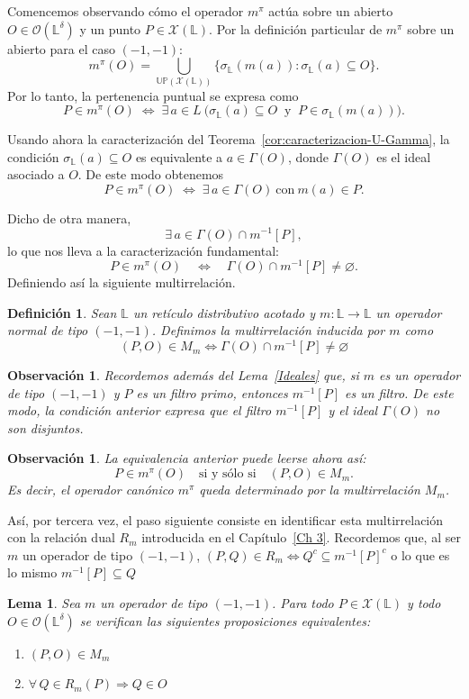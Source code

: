 \documentclass[12pt]{book}
\newtheorem{lemma}[theorem]{Lema}
\newtheorem{definition}[theorem]{Definición}
\newtheorem{remark}[theorem]{Observación}
\newcommand{\Up}{\mathbb{UP}}
\begin{document}
Comencemos observando cómo el operador $m^\pi$ actúa sobre un abierto $O\in\mathcal{O}(\mathbb{L}^\delta)$ y un punto $P\in\mathcal{X}(\mathbb L)$.
Por la definición particular de $m^\pi$ sobre un abierto para el caso $(-1,-1)$:
\[
m^\pi(O)=\bigcup_{\Up(\mathcal{X}(\mathbb L))}\{\sigma_{\mathbb L}(m(a)):\sigma_{\mathbb L}(a)\subseteq O\}.
\]
Por lo tanto, la pertenencia puntual se expresa como
\[
P\in m^\pi(O)
\;\Longleftrightarrow\;
\exists\,a\in L\ 
\bigl(\sigma_{\mathbb L}(a)\subseteq O
\ \text{ y }\ 
P\in\sigma_{\mathbb L}(m(a))\bigr).
\]

Usando ahora la caracterización del Teorema~\ref{cor:caracterizacion-U-Gamma},
la condición $\sigma_{\mathbb L}(a)\subseteq O$ es equivalente a
$a\in\Gamma(O)$, donde $\Gamma(O)$ es el ideal asociado a $O$.
De este modo obtenemos
\[
P\in m^\pi(O)
\;\Longleftrightarrow\;
\exists\,a\in\Gamma(O)\ \text{con}\ m(a)\in P.
\]

Dicho de otra manera,
\[
\exists\,a\in\Gamma(O)\cap m^{-1}[P],
\]
lo que nos lleva a la caracterización fundamental:
\[
P\in m^\pi(O)
\quad\Longleftrightarrow\quad
\Gamma(O)\cap m^{-1}[P]\neq\varnothing.
\]
Definiendo así la siguiente multirrelación.

\begin{definition}
\label{def:multirrelacion-inducida-(-1,-1)}
Sean $\mathbb{L}$ un retículo distributivo acotado y $m : \mathbb{L} \to \mathbb{L}$ un operador normal de tipo $(-1,-1)$. Definimos la \emph{multirrelación inducida por $m$} como
\[
(P,O) \in M_m 
\iff 
\Gamma(O)\cap m^{-1}[P]\neq\varnothing
\]
\end{definition}

\noindent
\begin{remark}
Recordemos además del Lema~\ref{Ideales} que, si
$m$ es un operador de tipo $(-1,-1)$ y $P$ es un filtro primo, entonces $m^{-1}[P]$ es un filtro.  De este modo, la condición anterior expresa que el filtro $m^{-1}[P]$ y el ideal $\Gamma(O)$ no son disjuntos.
\end{remark}

\begin{remark}\label{obs:O-M}
La equivalencia anterior puede leerse ahora así:
\[
P\in m^\pi(O)
\quad\text{si y sólo si}\quad
(P,O)\in M_m.
\]
Es decir, el operador canónico $m^\pi$ queda determinado por la multirrelación $M_m$.
\end{remark}
Así, por tercera vez, el paso siguiente consiste en identificar esta multirrelación con la relación dual $R_m$ introducida en el Capítulo~\ref{Ch 3}. Recordemos que, al ser $m$ un operador de tipo \((-1,-1)\), $(P,Q)\in R_m\iff Q^c\subseteq m^{-1}[P]^c$ o lo que es lo mismo $m^{-1}[P]\subseteq Q$
\begin{lemma}\label{lem:M-R}
Sea \(m\) un operador de tipo \((-1,-1)\). 
Para todo \(P\in\mathcal{X}(\mathbb L)\) y todo \(O\in\mathcal O(\mathbb L^\delta)\) se verifican las siguientes proposiciones equivalentes:
\begin{enumerate}
    \item $(P,O)\in M_m$
    \item $\forall\, Q\in R_m(P) \Rightarrow Q\in O$
\end{enumerate}
\end{lemma}
\end{document}
